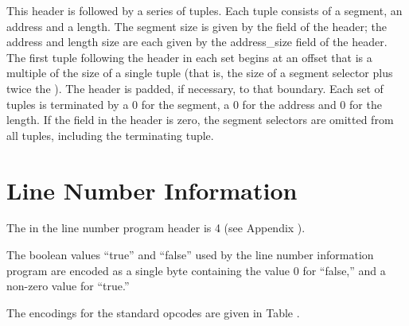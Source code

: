 This header is followed by a series of tuples. Each tuple
consists of a segment, an address and a length. 
The segment
size is given by the  field of the header; the
address and length size are each given by the address\_size
field of the header. 
The first tuple following the header in
each set begins at an offset that is a multiple of the size
of a single tuple (that is, the size of a segment selector
plus twice the ). 
The header is padded, if
necessary, to that boundary. Each set of tuples is terminated
by a 0 for the segment, a 0 for the address and 0 for the
length. If the  field in the header is zero,
the segment selectors are omitted from all tuples, including
the terminating tuple.


\section{Line Number Information}
\label{datarep:linenumberinformation}

The 
in the line number program header is 4
(see Appendix ). 

The boolean values ``true'' and ``false'' 
used by the line number information program are encoded
as a single byte containing the value 0 
for ``false,'' and a non-zero value for ``true.''

The encodings for the standard opcodes are given in 
Table .

